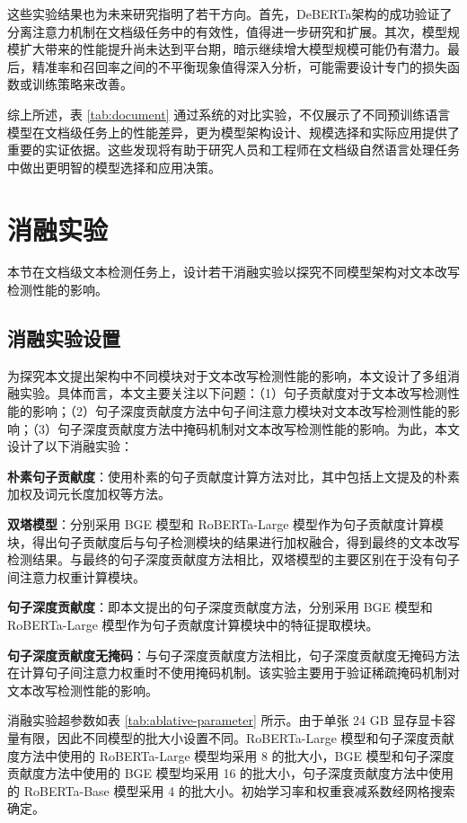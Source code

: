 这些实验结果也为未来研究指明了若干方向。首先，DeBERTa架构的成功验证了分离注意力机制在文档级任务中的有效性，值得进一步研究和扩展。其次，模型规模扩大带来的性能提升尚未达到平台期，暗示继续增大模型规模可能仍有潜力。最后，精准率和召回率之间的不平衡现象值得深入分析，可能需要设计专门的损失函数或训练策略来改善。

综上所述，表 \ref{tab:document} 通过系统的对比实验，不仅展示了不同预训练语言模型在文档级任务上的性能差异，更为模型架构设计、规模选择和实际应用提供了重要的实证依据。这些发现将有助于研究人员和工程师在文档级自然语言处理任务中做出更明智的模型选择和应用决策。

\section{消融实验}
\label{sec:method-experiment-ablative}

本节在文档级文本检测任务上，设计若干消融实验以探究不同模型架构对文本改写检测性能的影响。

\subsection{消融实验设置}
\label{sec:method-experiment-ablative-design}

为探究本文提出架构中不同模块对于文本改写检测性能的影响，本文设计了多组消融实验。具体而言，本文主要关注以下问题：（1）句子贡献度对于文本改写检测性能的影响；（2）句子深度贡献度方法中句子间注意力模块对文本改写检测性能的影响；（3）句子深度贡献度方法中掩码机制对文本改写检测性能的影响。为此，本文设计了以下消融实验：

\textbf{朴素句子贡献度}：使用朴素的句子贡献度计算方法对比，其中包括上文提及的朴素加权及词元长度加权等方法。

\textbf{双塔模型}：分别采用 BGE 模型和 RoBERTa-Large 模型作为句子贡献度计算模块，得出句子贡献度后与句子检测模块的结果进行加权融合，得到最终的文本改写检测结果。与最终的句子深度贡献度方法相比，双塔模型的主要区别在于没有句子间注意力权重计算模块。

\textbf{句子深度贡献度}：即本文提出的句子深度贡献度方法，分别采用 BGE 模型和 RoBERTa-Large 模型作为句子贡献度计算模块中的特征提取模块。

\textbf{句子深度贡献度无掩码}：与句子深度贡献度方法相比，句子深度贡献度无掩码方法在计算句子间注意力权重时不使用掩码机制。该实验主要用于验证稀疏掩码机制对文本改写检测性能的影响。

消融实验超参数如表 \ref{tab:ablative-parameter} 所示。由于单张 24 GB 显存显卡容量有限，因此不同模型的批大小设置不同。RoBERTa-Large 模型和句子深度贡献度方法中使用的 RoBERTa-Large 模型均采用 8 的批大小，BGE 模型和句子深度贡献度方法中使用的 BGE 模型均采用 16 的批大小，句子深度贡献度方法中使用的 RoBERTa-Base 模型采用 4 的批大小。初始学习率和权重衰减系数经网格搜索确定。

